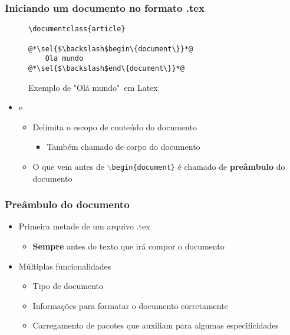 \begin{frame}[fragile] \frametitle{Iniciando um documento no formato .tex}
\begin{figure}[!t]
\caption{Exemplo de "Olá mundo"~em Latex}
\begin{lstlisting}
\documentclass{article}

@*\sel{$\backslash$begin\{document\}}*@
	Ola mundo
@*\sel{$\backslash$end\{document\}}*@
\end{lstlisting}
\ownsrc
\end{figure}

\begin{itemize}
	\item {} e 
	\begin{itemize}
		\item Delimita o escopo de conteúdo do documento
		\begin{itemize}
			\item Também chamado de corpo do documento
		\end{itemize}
		\item O que vem antes de \texttt{$\backslash$begin\{document\}} é chamado de \textbf{preâmbulo} do documento
	\end{itemize}
\end{itemize}
\end{frame}

\begin{frame} \frametitle{Preâmbulo do documento}
\begin{itemize}
	\item Primeira metade de um arquivo .tex
	\begin{itemize}
		\item \textbf{Sempre} antes do texto que irá compor o documento
	\end{itemize}
	\item Múltiplas funcionalidades
	\begin{itemize}
		\item Tipo de documento
		\item Informações para formatar o documento corretamente
		\item Carregamento de pacotes que auxiliam para algumas especificidades
	\end{itemize}
\end{itemize}
\end{frame}

